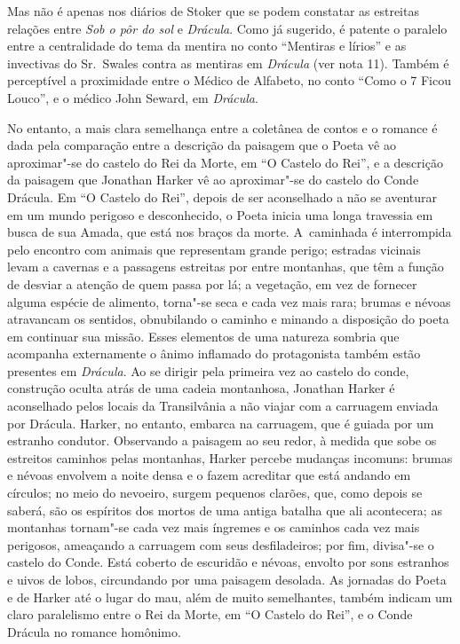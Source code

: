 Mas não é apenas nos diários de Stoker que se podem constatar as
estreitas relações entre \emph{Sob o pôr do sol} e \emph{Drácula}. Como já sugerido, é
patente o paralelo entre a centralidade do tema da mentira no conto
``Mentiras e lírios'' e as invectivas do Sr.~Swales contra as mentiras
em \emph{Drácula} (ver nota 11). Também é perceptível a proximidade entre o
Médico de Alfabeto, no conto ``Como o 7 Ficou Louco'', e o médico John
Seward, em \emph{Drácula}.

No entanto, a mais clara semelhança entre a coletânea de contos e o
romance é dada pela comparação entre a descrição da paisagem que o Poeta
vê ao aproximar"-se do castelo do Rei da Morte, em ``O Castelo do Rei'',
e a descrição da paisagem que Jonathan Harker vê ao aproximar"-se do
castelo do Conde Drácula. Em ``O Castelo do Rei'', depois de ser
aconselhado a não se aventurar em um mundo perigoso e desconhecido, o
Poeta inicia uma longa travessia em busca de sua Amada, que está nos
braços da morte. A~caminhada é interrompida pelo encontro com animais
que representam grande perigo; estradas vicinais levam a cavernas e a
passagens estreitas por entre montanhas, que têm a função de desviar a
atenção de quem passa por lá; a vegetação, em vez de fornecer alguma
espécie de alimento, torna"-se seca e cada vez mais rara; brumas e névoas
atravancam os sentidos, obnubilando o caminho e minando a disposição do
poeta em continuar sua missão. Esses elementos de uma natureza sombria
que acompanha externamente o ânimo inflamado do protagonista também
estão presentes em \emph{Drácula}. Ao se dirigir pela primeira vez ao
castelo do conde, construção oculta atrás de uma cadeia montanhosa,
Jonathan Harker é aconselhado pelos locais da Transilvânia a não viajar
com a carruagem enviada por Drácula. Harker, no entanto, embarca na
carruagem, que é guiada por um estranho condutor. Observando a paisagem
ao seu redor, à medida que sobe os estreitos caminhos pelas montanhas,
Harker percebe mudanças incomuns: brumas e névoas envolvem a noite densa
e o fazem acreditar que está andando em círculos; no meio do nevoeiro,
surgem pequenos clarões, que, como depois se saberá, são os espíritos
dos mortos de uma antiga batalha que ali acontecera; as montanhas
tornam"-se cada vez mais íngremes e os caminhos cada vez mais perigosos,
ameaçando a carruagem com seus desfiladeiros; por fim, divisa"-se o
castelo do Conde. Está coberto de escuridão e névoas, envolto por sons
estranhos e uivos de lobos, circundando por uma paisagem desolada. As
jornadas do Poeta e de Harker até o lugar do mau, além de muito
semelhantes, também indicam um claro paralelismo entre o Rei da Morte,
em ``O Castelo do Rei'', e o Conde Drácula no romance homônimo.


